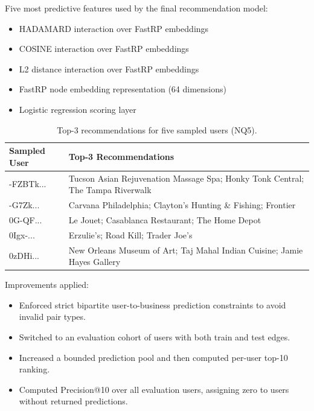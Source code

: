 \documentclass[11pt,a4paper]{article}
\begin{document}
Five most predictive features used by the final recommendation model:
\begin{itemize}
    \item HADAMARD interaction over FastRP embeddings
    \item COSINE interaction over FastRP embeddings
    \item L2 distance interaction over FastRP embeddings
    \item FastRP node embedding representation (64 dimensions)
    \item Logistic regression scoring layer
\end{itemize}

\begin{table}[H]
\centering
\small
\begin{tabularx}{\textwidth}{lX}
\toprule
\textbf{Sampled User} & \textbf{Top-3 Recommendations} \\
\midrule
-FZBTk... & Tucson Asian Rejuvenation Massage Spa; Honky Tonk Central; The Tampa Riverwalk \\
-G7Zk... & Carvana Philadelphia; Clayton's Hunting \& Fishing; Frontier \\
0G-QF... & Le Jouet; Casablanca Restaurant; The Home Depot \\
0Igx-... & Erzulie's; Road Kill; Trader Joe's \\
0zDHi... & New Orleans Museum of Art; Taj Mahal Indian Cuisine; Jamie Hayes Gallery \\
\bottomrule
\end{tabularx}
\caption{Top-3 recommendations for five sampled users (NQ5).}
\end{table}

Improvements applied:
\begin{itemize}
    \item Enforced strict bipartite user-to-business prediction constraints to avoid invalid pair types.
    \item Switched to an evaluation cohort of users with both train and test edges.
    \item Increased a bounded prediction pool and then computed per-user top-10 ranking.
    \item Computed Precision@10 over all evaluation users, assigning zero to users without returned predictions.
\end{itemize}
\end{document}
